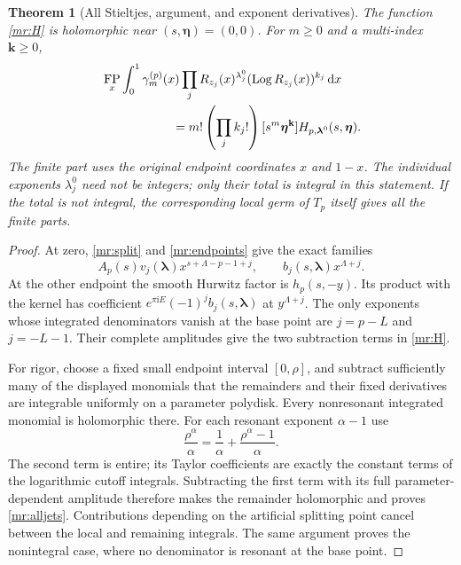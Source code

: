 \documentclass[11pt]{article}
\numberwithin{equation}{section}
\theoremstyle{plain}
\newtheorem{theorem}{Theorem}[section]
\theoremstyle{definition}
\theoremstyle{remark}
\DeclareMathOperator{\Log}{Log}
\DeclareMathOperator{\FP}{FP}
\newcommand{\ii}{\mathrm i}
\newcommand{\dd}{\,\mathrm d}
\begin{document}
\begin{theorem}[All Stieltjes, argument, and exponent derivatives]
\label{mr:completion}
The function \eqref{mr:H} is holomorphic near $(s,\boldsymbol\eta)=(0,0)$.
For $m\ge0$ and a multi-index $\mathbf k\ge0$,
\begin{align}
 &\FP_x\int_0^1\gamma_m^{(p)}(x)
       \prod_j R_{z_j}(x)^{\lambda_j^0}
                       (\Log R_{z_j}(x))^{k_j}\dd x\notag\\
 &\hspace{20mm}=m!\left(\prod_j k_j!\right)
                    [s^m\boldsymbol\eta^{\mathbf k}]
                             H_{p,\boldsymbol\lambda^0}(s,\boldsymbol\eta).
       \label{mr:alljets}
\end{align}
The finite part uses the original endpoint coordinates $x$ and $1-x$.
The individual exponents $\lambda_j^0$ need not be integers; only
their total is integral in this statement. If the total is not integral,
the corresponding local germ of $T_p$ itself gives all the finite parts.
\end{theorem}

\begin{proof}
At zero, \eqref{mr:split} and \eqref{mr:endpoints} give the exact
families
\[
 A_p(s)v_j(\boldsymbol\lambda)x^{s+\Lambda-p-1+j},\qquad
 b_j(s,\boldsymbol\lambda)x^{\Lambda+j}.
\]
At the other endpoint the smooth Hurwitz factor is $h_p(s,-y)$.
Its product with the kernel has coefficient
$e^{\pi\ii E}(-1)^jb_j(s,\boldsymbol\lambda)$ at $y^{\Lambda+j}$.
The only exponents whose integrated denominators vanish at the base
point are $j=p-L$ and $j=-L-1$. Their complete amplitudes give the
two subtraction terms in \eqref{mr:H}.

For rigor, choose a fixed small endpoint interval $[0,\rho]$, and
subtract sufficiently many of the displayed monomials that the remainders
and their fixed derivatives are integrable uniformly on a parameter
polydisk. Every nonresonant integrated monomial is holomorphic there.
For each resonant exponent $\alpha-1$ use
\[
 \frac{\rho^\alpha}{\alpha}
             =\frac1\alpha+\frac{\rho^\alpha-1}{\alpha}.
\]
The second term is entire; its Taylor coefficients are exactly the
constant terms of the logarithmic cutoff integrals. Subtracting the
first term with its full parameter-dependent amplitude therefore makes
the remainder holomorphic and proves \eqref{mr:alljets}. Contributions
depending on the artificial splitting point cancel between the local
and remaining integrals. The same argument proves the nonintegral case,
where no denominator is resonant at the base point.
\end{proof}
\end{document}
